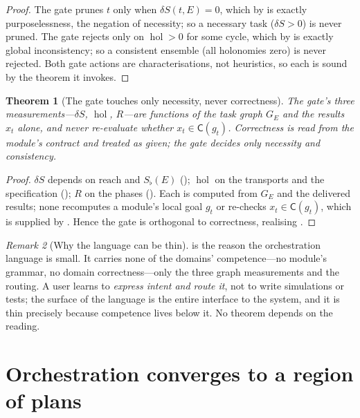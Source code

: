 \documentclass[twocolumn,11pt,a4paper]{article}
\theoremstyle{sup}
\newtheorem{theorem}{Theorem}[section]
\theoremstyle{definition}
\theoremstyle{remark}
\newtheorem{remark}[theorem]{Remark}
\DeclareMathOperator{\hol}{hol}
\newcommand{\reach}{\mathrm{reach}}   %
\newcommand{\Sent}{S}                 %
\newcommand{\Sflat}{S_{\flat}}        %
\newcommand{\cell}{\mathsf{C}}        %
\newcommand{\task}{t}
\newcommand{\Ens}{E}                  %
\newcommand{\contrib}{\delta\Sent}    %
\newcommand{\Rens}{R}                 %
\begin{document}
\begin{proof}
The gate prunes $\task$ only when $\contrib(\task,\Ens)=0$, which by
 is exactly purposelessness, the negation of necessity; so
a necessary task ($\contrib>0$) is never pruned. The gate rejects only on
$\hol>0$ for some cycle, which by  is exactly global
inconsistency; so a consistent ensemble (all holonomies zero) is never rejected.
Both gate actions are characterisations, not heuristics, so each is sound by the
theorem it invokes.
\end{proof}

\begin{theorem}[The gate touches only necessity, never correctness]
\label{thm:gate-orthogonal}
The gate's three measurements---$\contrib$, $\hol$, $\Rens$---are functions of the
task graph $G_\Ens$ and the results $x_\task$ alone, and never re-evaluate whether
$x_\task\in\cell(g_\task)$. Correctness is read from the module's contract and
treated as given; the gate decides only necessity and consistency.
\end{theorem}

\begin{proof}
$\contrib$ depends on $\reach$ and $\Sflat(\Ens)$ (); $\hol$ on
the transports and the specification (); $\Rens$ on the phases
(). Each is computed from $G_\Ens$ and the delivered results; none
recomputes a module's local goal $g_\task$ or re-checks $x_\task\in\cell(g_\task)$,
which is supplied by . Hence the gate is orthogonal to
correctness, realising .
\end{proof}

\begin{remark}[Why the language can be thin]
\label{rem:thin}
 is the reason the orchestration language is small. It
carries none of the domains' competence---no module's grammar, no domain
correctness---only the three graph measurements and the routing. A user learns to
\emph{express intent and route it}, not to write simulations or tests; the surface
of the language is the entire interface to the system, and it is thin precisely
because competence lives below it. No theorem depends on the reading.
\end{remark}

\section{Orchestration converges to a region of plans}
\label{sec:cell}
\end{document}
